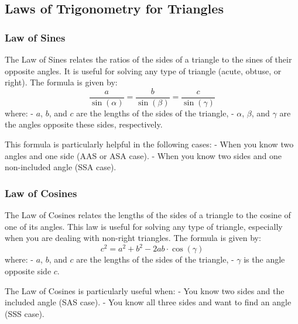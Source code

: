 \subsection{Laws of Trigonometry for Triangles}

\subsubsection{Law of Sines}

The Law of Sines relates the ratios of the sides of a triangle to the sines of their opposite angles. It is useful for solving any type of triangle (acute, obtuse, or right). The formula is given by:
\[
\frac{a}{\sin(\alpha)} = \frac{b}{\sin(\beta)} = \frac{c}{\sin(\gamma)}
\]
where:
- \( a \), \( b \), and \( c \) are the lengths of the sides of the triangle,
- \( \alpha \), \( \beta \), and \( \gamma \) are the angles opposite these sides, respectively.

This formula is particularly helpful in the following cases:
- When you know two angles and one side (AAS or ASA case).
- When you know two sides and one non-included angle (SSA case).

\subsubsection{Law of Cosines}

The Law of Cosines relates the lengths of the sides of a triangle to the cosine of one of its angles. This law is useful for solving any type of triangle, especially when you are dealing with non-right triangles. The formula is given by:
\[
c^2 = a^2 + b^2 - 2ab \cdot \cos(\gamma)
\]
where:
- \( a \), \( b \), and \( c \) are the lengths of the sides of the triangle,
- \( \gamma \) is the angle opposite side \( c \).

The Law of Cosines is particularly useful when:
- You know two sides and the included angle (SAS case).
- You know all three sides and want to find an angle (SSS case).
